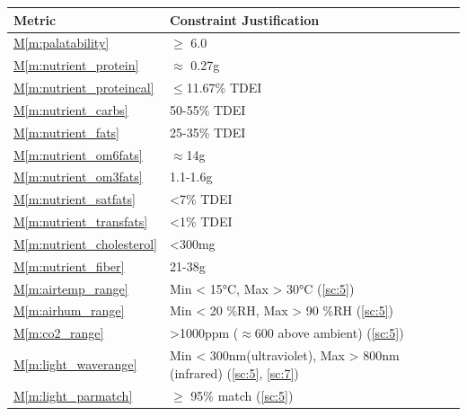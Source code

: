\documentclass{../tex/report}
\newcommand{\mref}[1]{\hyperref[#1]{M\ref{#1}}}
\begin{document}
\begin{tabular}{|l|p{14.35cm}|}
    \hline
    \textbf{Metric} & \textbf{Constraint \hfill Justification} \\
    \hline
    \mref{m:palatability} & $\ge$ 6.0 \hfill \cite{applicantguide,dsfc-phase2}\\
    \hline
    \mref{m:nutrient_protein} & $\approx$ 0.27g \hfill \cite{applicantguide,dsfc-phase2,nutrition}\\
    \hline
    \mref{m:nutrient_proteincal} & $\le$11.67\% TDEI \hfill \cite{applicantguide,dsfc-phase2,nutrition}\\
    \hline
    \mref{m:nutrient_carbs} & 50-55\% TDEI \hfill \cite{applicantguide,dsfc-phase2,nutrition}\\
    \hline
    \mref{m:nutrient_fats} & 25-35\% TDEI \hfill \cite{applicantguide,dsfc-phase2,nutrition}\\
    \hline
    \mref{m:nutrient_om6fats} & $\approx$14g \hfill \cite{applicantguide,dsfc-phase2,nutrition}\\
    \hline
    \mref{m:nutrient_om3fats} & 1.1-1.6g \hfill \cite{applicantguide,dsfc-phase2,nutrition}\\
    \hline
    \mref{m:nutrient_satfats} & <7\% TDEI \hfill \cite{applicantguide,dsfc-phase2,nutrition}\\
    \hline
    \mref{m:nutrient_transfats} & <1\% TDEI \hfill \cite{applicantguide,dsfc-phase2,nutrition}\\
    \hline
    \mref{m:nutrient_cholesterol} & <300mg \hfill \cite{applicantguide,dsfc-phase2,nutrition}\\
    \hline
    \mref{m:nutrient_fiber} & 21-38g \hfill \cite{applicantguide,dsfc-phase2,nutrition}\\
    \hline
    \mref{m:airtemp_range} & Min < 15°C, Max > 30°C \hfill (\ref{sc:5})\\
    \hline
    \mref{m:airhum_range} & Min < 20 \%RH, Max > 90 \%RH \hfill (\ref{sc:5}) \\
    \hline
    \mref{m:co2_range} & >1000ppm ($\approx$600 above ambient) \hfill (\ref{sc:5}) \\
    \hline
    \mref{m:light_waverange} & Min < 300nm\footnotemark[6] (ultraviolet), Max > 800nm (infrared) \hfill (\ref{sc:5}, \ref{sc:7}) \cite{uvc-disinfection} \\
    \hline
    \mref{m:light_parmatch} & $\ge$ 95\% match \hfill (\ref{sc:5}) \\

\end{tabular}
\end{document}

